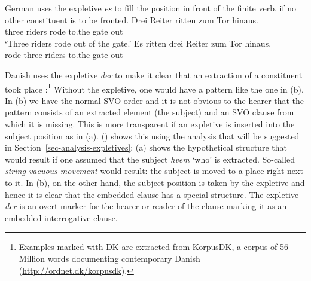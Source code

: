German uses the expletive \emph{es} to fill the position in front of the finite verb, if no other
constituent is to be fronted.
\eal
\ex 
\gll Drei Reiter ritten zum Tor hinaus.\\
     three riders rode  to.the gate out\\\german
\glt `Three riders rode out of the gate.'
\ex 
\gll Es ritten drei Reiter zum Tor hinaus.\\
     \expl{} rode   three riders to.the gate out\\
\zl

Danish uses the expletive \emph{der} to make it clear that an extraction of a constituent took place
\citep[]{MOe2011a}:\footnote{
  Examples marked with DK are extracted from KorpusDK, a corpus of 56 Million words documenting
  contemporary Danish (\url{http://ordnet.dk/korpusdk}).
}
\eal
\label{ex-danish-interrogative-expletive}
\zl
Without the expletive, one would have a pattern like the one in (b). In (b) we have the
normal SVO order and it is not obvious to the hearer that the pattern consists of an extracted
element (the subject) and an SVO clause from which it is missing. This is more transparent if an
expletive is inserted into the subject position as in (a). () shows this using the
analysis that will be suggested in Section~\ref{sec-analysis-expletives}: (a) shows the hypothetical
structure that would result if one assumed that the subject \emph{hvem} `who' is
extracted. So-called \emph{string-vacuous movement} would result: the subject is moved to a place
right next to it. In (b), on the other hand, the subject position is taken by the expletive and
hence it is clear that the embedded clause has a special structure. The expletive \emph{der} is an overt marker for
the hearer or reader of the clause marking it as an embedded interrogative clause.
\eal
{}
\zl

